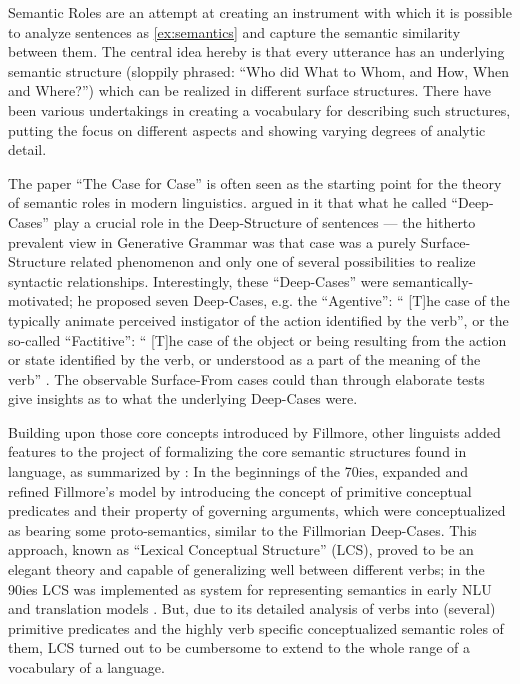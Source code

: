 Semantic Roles are an attempt at creating an instrument with which it is possible to analyze
sentences as \ref{ex:semantics} and capture the semantic similarity between them. The central
idea hereby is that every utterance has an underlying semantic structure (sloppily phrased: ``Who did What to Whom, and How, When and Where?'') which
can be realized in different surface structures. There have been various undertakings in
creating a vocabulary for describing such structures, putting the focus on different aspects and showing varying degrees of {\color{red} analytic detail}.

The paper ``The Case for Case'' \citep{fillmore1967case} is often seen as the starting point for
the theory of semantic roles in modern linguistics. \citeauthor{fillmore1967case} argued in it
that what he called ``Deep-Cases'' play a crucial role in the Deep-Structure of sentences ---
the hitherto prevalent view in Generative Grammar was that case was a purely Surface-Structure
related phenomenon and only one of several possibilities to realize syntactic relationships.
Interestingly, these ``Deep-Cases'' were semantically-motivated; he proposed
seven Deep-Cases, e.g. the ``Agentive'': `` [T]he case of the typically animate perceived instigator of the
action identified by the verb'', or the so-called ``Factitive'': `` [T]he case of the object or being resulting from the action or
state identified by the verb, or understood as a part of the meaning of the verb'' \citep[p.~46]{fillmore1967case}.
The observable Surface-From cases could than through elaborate tests give insights as to what the
underlying Deep-Cases were.

Building upon those core concepts introduced by Fillmore, other linguists added features
to the project of formalizing the core semantic structures found in language, as summarized by
\citeauthor{palmer2010semantic}:
In the beginnings of the 70ies, \cite{jackendoff1972semantic} expanded and refined Fillmore's
model by introducing the concept of primitive conceptual predicates and their property of governing
arguments, which were conceptualized as bearing some proto-semantics, similar to the Fillmorian
Deep-Cases. This approach, known as ``Lexical Conceptual Structure'' (LCS), proved to be
an elegant theory and capable of generalizing well between different verbs; in the 90ies LCS
was implemented as system for representing semantics in early NLU and translation models \citep{palmer2010semantic}.
But, due to its detailed analysis of verbs into (several) primitive predicates and the highly verb specific
conceptualized semantic roles of them, LCS turned out to be cumbersome to extend to the whole range
of a vocabulary of a language.

